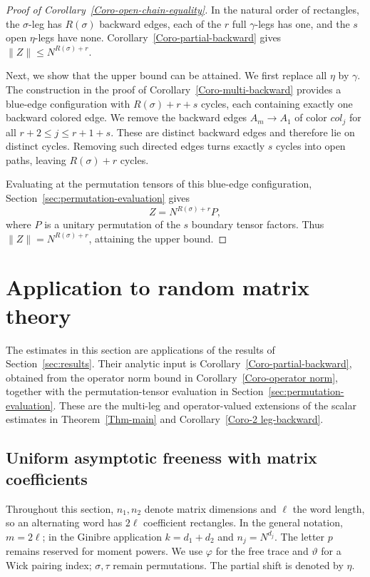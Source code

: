 \documentclass[12pt]{article}
\numberwithin{equation}{section}
\theoremstyle{plain}
\begin{document}
\begin{proof}[Proof of Corollary~\ref{Coro-open-chain-equality}]
In the natural order of rectangles, the $\sigma$-leg has $R(\sigma)$ backward edges, each of the $r$ full $\gamma$-legs has one, and the $s$ open $\eta$-legs have none. Corollary~\ref{Coro-partial-backward} gives $\|Z\|\le N^{R(\sigma)+r}$.

Next, we show that the upper bound can be attained. We first replace all $\eta$ by $\gamma$. The construction in the proof of Corollary~\ref{Coro-multi-backward} provides a blue-edge configuration with $R(\sigma)+r+s$ cycles, each containing exactly one backward colored edge. We remove the backward edges $A_m\to A_1$ of color $col_{j}$ for all $r+2 \le j \le r+1+s$. These are distinct backward edges and therefore lie on distinct cycles. Removing such directed edges turns exactly $s$ cycles into open paths, leaving $R(\sigma)+r$ cycles.

Evaluating at the permutation tensors of this blue-edge configuration, Section~\ref{sec:permutation-evaluation} gives
\[
Z=N^{R(\sigma)+r}P,
\]
where $P$ is a unitary permutation of the $s$ boundary tensor factors. Thus $\|Z\|=N^{R(\sigma)+r}$, attaining the upper bound.
\end{proof}

\section{Application to random matrix theory} \label{sec:application}

The estimates in this section are applications of the results of Section~\ref{sec:results}. Their analytic input is Corollary~\ref{Coro-partial-backward}, obtained from the operator norm bound in Corollary~\ref{Coro-operator norm}, together with the permutation-tensor evaluation in Section~\ref{sec:permutation-evaluation}. These are the multi-leg and operator-valued extensions of the scalar estimates in Theorem~\ref{Thm-main} and Corollary~\ref{Coro-2 leg-backward}.

\subsection{Uniform asymptotic freeness with matrix coefficients}

Throughout this section, $n_1,n_2$ denote matrix dimensions and $\ell$ the word length, so an alternating word has $2\ell$ coefficient rectangles. In the general notation, $m=2\ell$; in the Ginibre application $k=d_1+d_2$ and $n_j=N^{d_j}$. The letter $p$ remains reserved for moment powers. We use $\varphi$ for the free trace and $\vartheta$ for a Wick pairing index; $\sigma,\tau$ remain permutations. The partial shift is denoted by $\eta$.
\end{document}
